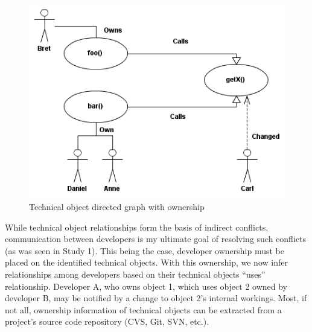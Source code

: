 \begin{figure}[t!]
\includegraphics[width=\columnwidth]{figures/CallGraph}
\caption{Technical object directed graph with ownership\label{fig:graph}}
\end{figure}

While technical object relationships form the basis of indirect conflicts,
communication between developers is my ultimate goal of resolving such conflicts
(as was seen in Study 1).
This being the case, developer ownership must be placed on the 
identified technical objects. With this ownership, we now infer
relationships among developers based on their technical objects
``uses'' relationship. Developer A, who owns object 1, which uses 
object 2 owned by developer B, may be notified by a change to
object 2's internal workings. Most, if not all, ownership information
of technical objects can be extracted from a project's source code
repository (CVS, Git, SVN, etc.).

